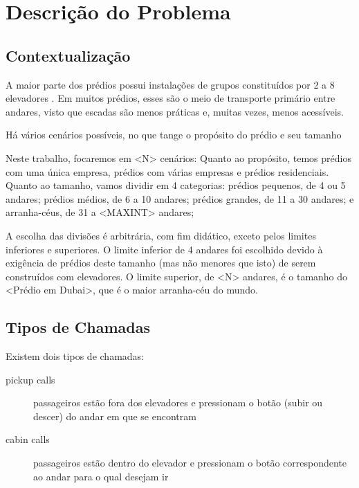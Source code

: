 \chapter{\label{chap:problem}Descrição do Problema}

\section{Contextualização}

A maior parte dos prédios possui instalações de grupos constituídos por 2 a 8
elevadores \cite{KOEHLEROTTIGER02}. Em muitos prédios, esses são o meio de
transporte primário entre andares, visto que escadas são menos práticas e,
muitas vezes, menos acessíveis. %

Há vários cenários possíveis, no que tange o propósito do prédio e seu tamanho

Neste trabalho, focaremos em <N> cenários: Quanto ao propósito, temos prédios
com uma única empresa, prédios com várias empresas e prédios residenciais.
Quanto ao tamanho, vamos dividir em 4 categorias: prédios pequenos, de 4 ou 5
andares; prédios médios, de 6 a 10 andares; prédios grandes, de 11 a 30 andares;
e arranha-céus, de 31 a <MAXINT> andares;



A escolha das divisões é arbitrária, com fim didático, exceto pelos limites
inferiores e superiores. O limite inferior de 4 andares foi escolhido devido à
exigência de prédios deste tamanho (mas não menores que isto) de serem
construídos com elevadores. O limite superior, de <N> andares, é o tamanho do
<Prédio em Dubai>, que é o maior arranha-céu do mundo.

\section{Tipos de Chamadas}

Existem dois tipos de chamadas:

\begin{description}
\item[pickup calls] passageiros estão fora dos elevadores e pressionam o botão (subir ou descer) do andar em que se encontram
\item[cabin calls] passageiros estão dentro do elevador e pressionam o botão correspondente ao andar para o qual desejam ir
\end{description}


